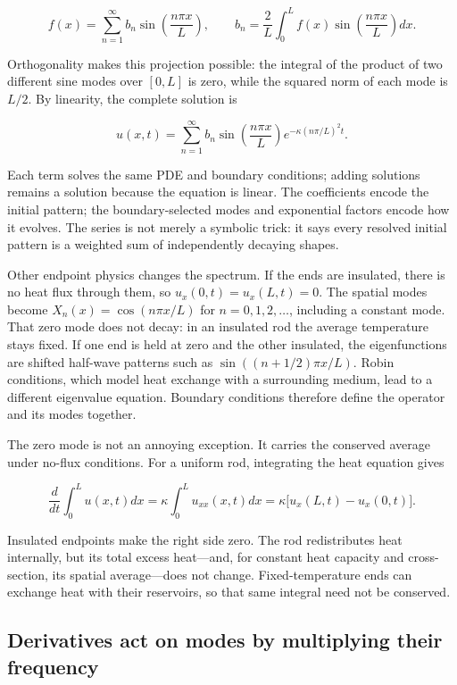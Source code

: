 \[
f(x)=\sum_{n=1}^{\infty}b_n\sin\left(\frac{n\pi x}{L}\right),
\qquad
b_n=\frac{2}{L}\int_0^L f(x)\sin\left(\frac{n\pi x}{L}\right)dx.
\]

Orthogonality makes this projection possible: the integral of the product of two different sine modes over \([0,L]\) is zero, while the squared norm of each mode is \(L/2\). By linearity, the complete solution is

\[
u(x,t)=\sum_{n=1}^{\infty}b_n\sin\left(\frac{n\pi x}{L}\right)e^{-\kappa(n\pi/L)^2t}.
\]

Each term solves the same PDE and boundary conditions; adding solutions remains a solution because the equation is linear. The coefficients encode the initial pattern; the boundary-selected modes and exponential factors encode how it evolves. The series is not merely a symbolic trick: it says every resolved initial pattern is a weighted sum of independently decaying shapes.

Other endpoint physics changes the spectrum. If the ends are insulated, there is no heat flux through them, so \(u_x(0,t)=u_x(L,t)=0\). The spatial modes become \(X_n(x)=\cos(n\pi x/L)\) for \(n=0,1,2,\ldots\), including a constant mode. That zero mode does not decay: in an insulated rod the average temperature stays fixed. If one end is held at zero and the other insulated, the eigenfunctions are shifted half-wave patterns such as \(\sin((n+1/2)\pi x/L)\). Robin conditions, which model heat exchange with a surrounding medium, lead to a different eigenvalue equation. Boundary conditions therefore define the operator and its modes together.

The zero mode is not an annoying exception. It carries the conserved average under no-flux conditions. For a uniform rod, integrating the heat equation gives

\[
\frac{d}{dt}\int_0^L u(x,t)dx
=\kappa\int_0^L u_{xx}(x,t)dx
=\kappa\big[u_x(L,t)-u_x(0,t)\big].
\]

Insulated endpoints make the right side zero. The rod redistributes heat internally, but its total excess heat---and, for constant heat capacity and cross-section, its spatial average---does not change. Fixed-temperature ends can exchange heat with their reservoirs, so that same integral need not be conserved.

\subsection{Derivatives act on modes by multiplying their frequency}\label{04-visual-computing-ii-ch030-derivatives-act-on-modes-by-multiplying-their-frequency}

